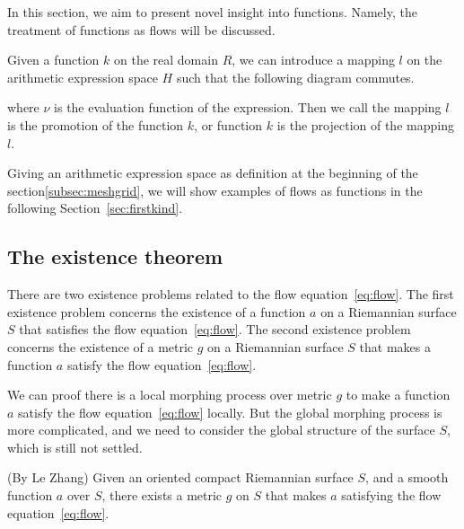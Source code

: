 In this section, we aim to present novel insight into functions.
Namely, the treatment of functions as flows will be discussed.

\begin{definition}\label{def:projection}
Given a function $k$ on the real domain $R$, we can introduce a mapping $l$ on the arithmetic expression space $H$ such that the following diagram commutes.

\begin{center}
\end{center}

where $\nu$ is the evaluation function of the expression. Then we call the mapping $l$ is the promotion of the function $k$,
or function $k$ is the projection of the mapping $l$.
\end{definition}

Giving an arithmetic expression space as definition at the beginning of the section\ref{subsec:meshgrid},
we will show examples of flows as functions in the following Section~\ref{sec:firstkind}.

\subsection{The existence theorem}\label{subsec:existence-theorem}

There are two existence problems related to the flow equation~\eqref{eq:flow}.
The first existence problem concerns the existence of a function $a$ on a Riemannian surface $S$ that satisfies the flow equation~\eqref{eq:flow}.
The second existence problem concerns the existence of a metric $g$ on a Riemannian surface $S$ that makes a function $a$ satisfy the flow equation~\eqref{eq:flow}.

We can proof there is a local morphing process over metric $g$ to make a function $a$ satisfy the flow equation~\eqref{eq:flow} locally.
But the global morphing process is more complicated, and we need to consider the global structure of the surface $S$, which is still not settled.

\begin{lemma}(By Le Zhang)
    Given an oriented compact Riemannian surface $S$, and a smooth function $a$ over $S$, there exists a metric $g$ on $S$ that makes $a$
    satisfying the flow equation~\eqref{eq:flow}.
    \label{prop:existence2nd}
\end{lemma}

